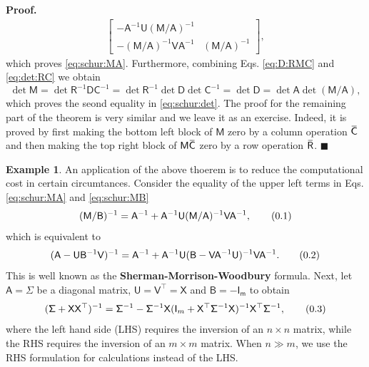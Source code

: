 \documentclass[10pt]{article}
\theoremstyle{definition}
\newtheorem{exmp}{Example}[section]
\newenvironment{prf}{\noindent\textbf{Proof.}}{\hfill$\blacksquare$}
\newcommand\eqnum{\addtocounter{equation}{1}\tag{\arabic{section}.\arabic{equation}}}
\newcommand{\overbar}[1]{\mkern 1.5mu\overline{\mkern-1.5mu#1\mkern-1.5mu}\mkern 1.5mu}
\begin{document}
\begin{prf}
\begin{align*}
\begin{bmatrix}
-\mathsf{A}^{-1}\mathsf{U}(\mathsf{M}/\mathsf{A})^{-1} \\
-(\mathsf{M}/\mathsf{A})^{-1}\mathsf{V}\mathsf{A}^{-1} & (\mathsf{M}/\mathsf{A})^{-1}
\end{bmatrix},
\end{align*}
which proves \cref{eq:schur:MA}. Furthermore, combining Eqs. \eqref{eq:D:RMC} and \eqref{eq:det:RC} we obtain
\begin{equation*}
\det\mathsf{M} = \det\mathsf{R}^{-1}\mathsf{D}\mathsf{C}^{-1} = \det\mathsf{R}^{-1} \det\mathsf{D} \det\mathsf{C}^{-1}
= \det\mathsf{D} = \det\mathsf{A}\det(\mathsf{M}/\mathsf{A}),
\end{equation*}
which proves the seond equality in \cref{eq:schur:det}. The proof for the remaining part of the theorem is very similar and we leave it as an exercise. Indeed, it is proved by first making the bottom left block of $\mathsf{M}$ zero by a column operation $\overbar{\mathsf{C}}$ and then making the top right block of $\mathsf{M}\overbar{\mathsf{C}}$ zero by a row operation $\overbar{\mathsf{R}}$.
\end{prf}
\begin{exmp}
An application of the above thoerem is to reduce the computational cost in certain circumtances. Consider the equality of the upper left terms in Eqs. \eqref{eq:schur:MA} and \eqref{eq:schur:MB}
\begin{equation*}
(\mathsf{M}/\mathsf{B})^{-1} = \mathsf{A}^{-1} + \mathsf{A}^{-1}\mathsf{U}(\mathsf{M}/\mathsf{A})^{-1}\mathsf{V}\mathsf{A}^{-1},
\eqnum
\end{equation*}
which is equivalent to
\begin{equation*}
(\mathsf{A} - \mathsf{U}\mathsf{B}^{-1}\mathsf{V})^{-1} = \mathsf{A}^{-1} + \mathsf{A}^{-1}\mathsf{U}(\mathsf{B}-\mathsf{V}\mathsf{A}^{-1}\mathsf{U})^{-1}\mathsf{V}\mathsf{A}^{-1}.
\eqnum
\label{eq:SMW:formula}
\end{equation*}
This is well known as the \textbf{Sherman-Morrison-Woodbury} formula. Next, let $\mathsf{A} = \mathsf{\Sigma}$ be a diagonal matrix, $\mathsf{U} = \mathsf{V}^{\top} = \mathsf{X}$ and $\mathsf{B} = -\mathsf{I_m}$ to obtain
\begin{equation*}
(\mathsf{\Sigma} + \mathsf{X}\mathsf{X}^{\top})^{-1} =
\mathsf{\Sigma}^{-1} - \mathsf{\Sigma}^{-1}\mathsf{X}(\mathsf{I}_m+\mathsf{X}^{\top}\mathsf{\Sigma}^{-1}\mathsf{X})^{-1}\mathsf{X}^{\top}\mathsf{\Sigma}^{-1},
\eqnum
\end{equation*}
where the left hand side (LHS) requires the inversion of an $n\times n$ matrix, while the RHS requires the inversion of an $m\times m$ matrix. When $n \gg m$, we use the RHS formulation for calculations instead of the LHS. 
\end{exmp}
\end{document}
